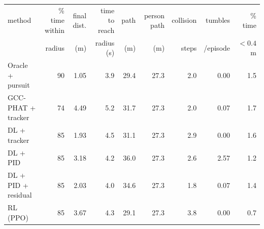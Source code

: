 \begin{tabular}{lrrrrrrrr}
\toprule
method & \% time within & final dist. & time to reach & path & person path & collision & tumbles & \% time\\
 & radius & (m) & radius (s) & (m) & (m) & steps & /episode & $<0.4$ m\\
\midrule
Oracle + pursuit & 90 & 1.05 & 3.9 & 29.4 & 27.3 & 2.0 & 0.00 & 1.5 \\
GCC-PHAT + tracker & 74 & 4.49 & 5.2 & 31.7 & 27.3 & 2.0 & 0.07 & 1.7 \\
DL + tracker & 85 & 1.93 & 4.5 & 31.1 & 27.3 & 2.9 & 0.00 & 1.6 \\
DL + PID & 85 & 3.18 & 4.2 & 36.0 & 27.3 & 2.6 & 2.57 & 1.2 \\
DL + PID + residual & 85 & 2.03 & 4.0 & 34.6 & 27.3 & 1.8 & 0.07 & 1.4 \\
RL (PPO) & 85 & 3.67 & 4.3 & 29.1 & 27.3 & 3.8 & 0.00 & 0.7 \\
\bottomrule
\end{tabular}
